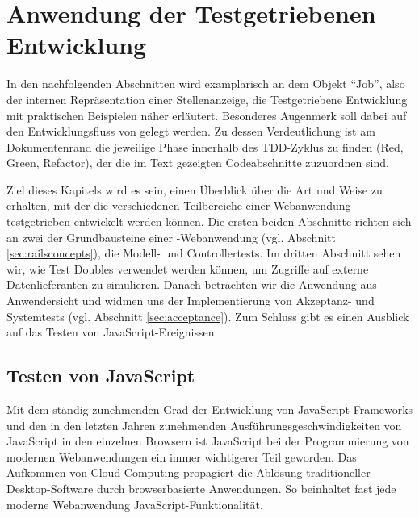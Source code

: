 \chapter{Anwendung der Testgetriebenen Entwicklung}
\label{sec:awtdd}

In den nachfolgenden Abschnitten wird examplarisch an dem Objekt "`Job"', also der internen Repräsentation einer Stellenanzeige, die Testgetriebene Entwicklung mit praktischen Beispielen näher erläutert.
Besonderes Augenmerk soll dabei auf den Entwicklungsfluss von  gelegt werden. Zu dessen Verdeutlichung ist am Dokumentenrand die jeweilige Phase innerhalb des TDD-Zyklus zu finden (Red, Green, Refactor), der die im Text gezeigten Codeabschnitte zuzuordnen sind.

Ziel dieses Kapitels wird es sein, einen Überblick über die Art und Weise zu erhalten, mit der die verschiedenen Teilbereiche einer Webanwendung testgetrieben entwickelt werden können.
Die ersten beiden Abschnitte richten sich an zwei der Grundbausteine einer -Webanwendung (vgl. Abschnitt \ref{sec:railsconcepts}), die Modell- und Controllertests. Im dritten Abschnitt sehen wir, wie Test Doubles verwendet werden können, um Zugriffe auf externe Datenlieferanten zu simulieren. Danach betrachten wir die Anwendung aus Anwendersicht und widmen uns der Implementierung von Akzeptanz- und Systemtests (vgl. Abschnitt \ref{sec:acceptance}).
Zum Schluss gibt es einen Ausblick auf das Testen von JavaScript-Ereignissen.






\section{Testen von JavaScript}

Mit dem ständig zunehmenden Grad der Entwicklung von JavaScript-Frameworks und den in den letzten Jahren zunehmenden Ausführungsgeschwindigkeiten von JavaScript in den einzelnen Browsern ist JavaScript bei der Programmierung von modernen Webanwendungen ein immer wichtigerer Teil geworden. Das Aufkommen von Cloud-Computing propagiert die Ablösung traditioneller Desktop-Software durch browserbasierte Anwendungen. So beinhaltet fast jede moderne Webanwendung JavaScript-Funktionalität.

